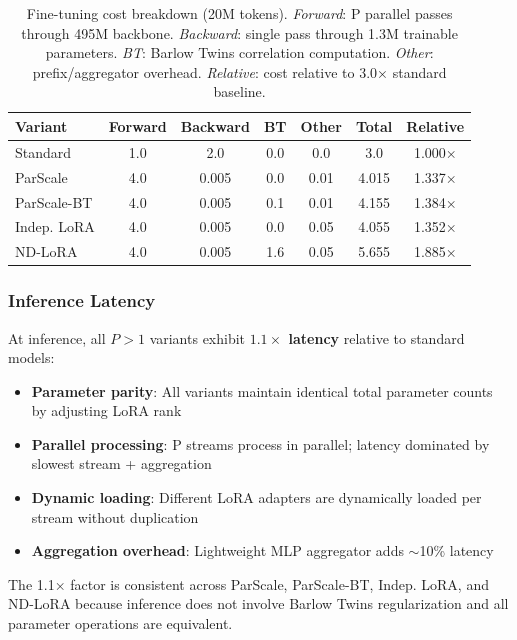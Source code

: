 \documentclass{article} %
\begin{document}
\begin{table}[ht]
  \centering
  \small
  \begin{tabular}{l|cccc|cc}
    \textbf{Variant} & \textbf{Forward} & \textbf{Backward} & \textbf{BT} & \textbf{Other} & \textbf{Total} &
    \textbf{Relative} \\
    \hline
    Standard       & 1.0 & 2.0   & 0.0  & 0.0  & 3.0   & 1.000× \\
    ParScale       & 4.0 & 0.005 & 0.0  & 0.01 & 4.015 & 1.337× \\
    ParScale-BT    & 4.0 & 0.005 & 0.1  & 0.01 & 4.155 & 1.384× \\
    Indep. LoRA    & 4.0 & 0.005 & 0.0  & 0.05 & 4.055 & 1.352× \\
    ND-LoRA        & 4.0 & 0.005 & 1.6  & 0.05 & 5.655 & 1.885× \\
  \end{tabular}
  \caption{Fine-tuning cost breakdown (20M tokens). \emph{Forward}: P parallel passes through 495M backbone.
    \emph{Backward}: single pass through 1.3M trainable parameters. \emph{BT}: Barlow Twins correlation
  computation. \emph{Other}: prefix/aggregator overhead. \emph{Relative}: cost relative to 3.0× standard baseline.}
  \label{tab:cost-breakdown}
\end{table}

\subsubsection{Inference Latency}

At inference, all $P>1$ variants exhibit \textbf{$1.1\times$ latency} relative to standard models:
\begin{itemize}
  \item \textbf{Parameter parity}: All variants maintain identical total parameter counts by adjusting LoRA rank
  \item \textbf{Parallel processing}: P streams process in parallel; latency dominated by slowest stream + aggregation
  \item \textbf{Dynamic loading}: Different LoRA adapters are dynamically loaded per stream without duplication
  \item \textbf{Aggregation overhead}: Lightweight MLP aggregator adds $\sim$10\% latency
\end{itemize}

The 1.1× factor is consistent across ParScale, ParScale-BT, Indep. LoRA, and ND-LoRA because inference does
not involve Barlow Twins regularization and all parameter operations are equivalent.
\end{document}
